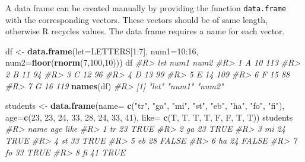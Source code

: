 \documentclass[]{book}
\newenvironment{Shaded}{}{}
\newcommand{\CommentTok}[1]{\textcolor[rgb]{0.38,0.63,0.69}{\textit{#1}}}
\newcommand{\DataTypeTok}[1]{\textcolor[rgb]{0.56,0.13,0.00}{#1}}
\newcommand{\DecValTok}[1]{\textcolor[rgb]{0.25,0.63,0.44}{#1}}
\newcommand{\KeywordTok}[1]{\textcolor[rgb]{0.00,0.44,0.13}{\textbf{#1}}}
\newcommand{\NormalTok}[1]{#1}
\newcommand{\OperatorTok}[1]{\textcolor[rgb]{0.40,0.40,0.40}{#1}}
\newcommand{\StringTok}[1]{\textcolor[rgb]{0.25,0.44,0.63}{#1}}
\theoremstyle{definition}
\theoremstyle{definition}
\theoremstyle{definition}
\theoremstyle{remark}
\begin{document}
A data frame can be created manually by providing the function
\texttt{data.frame} with the corresponding vectors. These vectors should
be of same length, otherwise R recycles values. The data frame requires
a name for each vector.

\begin{Shaded}
\begin{Highlighting}[]
\NormalTok{df <-}\StringTok{ }\KeywordTok{data.frame}\NormalTok{(}\DataTypeTok{let=}\NormalTok{LETTERS[}\DecValTok{1}\OperatorTok{:}\DecValTok{7}\NormalTok{],}
                 \DataTypeTok{num1=}\DecValTok{10}\OperatorTok{:}\DecValTok{16}\NormalTok{, }
                 \DataTypeTok{num2=}\KeywordTok{floor}\NormalTok{(}\KeywordTok{rnorm}\NormalTok{(}\DecValTok{7}\NormalTok{,}\DecValTok{100}\NormalTok{,}\DecValTok{10}\NormalTok{)))}
\NormalTok{df}
\CommentTok{#R>   let num1 num2}
\CommentTok{#R> 1   A   10  113}
\CommentTok{#R> 2   B   11   94}
\CommentTok{#R> 3   C   12   96}
\CommentTok{#R> 4   D   13   99}
\CommentTok{#R> 5   E   14  109}
\CommentTok{#R> 6   F   15   88}
\CommentTok{#R> 7   G   16  119}
\KeywordTok{names}\NormalTok{(df)}
\CommentTok{#R> [1] "let"  "num1" "num2"}
\end{Highlighting}
\end{Shaded}

\begin{Shaded}
\begin{Highlighting}[]
\NormalTok{students <-}\StringTok{ }\KeywordTok{data.frame}\NormalTok{(}\DataTypeTok{name=} \KeywordTok{c}\NormalTok{(}\StringTok{"tr"}\NormalTok{, }\StringTok{"ga"}\NormalTok{, }\StringTok{"mi"}\NormalTok{, }\StringTok{"st"}\NormalTok{, }\StringTok{"eb"}\NormalTok{, }\StringTok{"ha"}\NormalTok{, }\StringTok{"fo"}\NormalTok{, }\StringTok{"fi"}\NormalTok{),}
                       \DataTypeTok{age=}\KeywordTok{c}\NormalTok{(}\DecValTok{23}\NormalTok{, }\DecValTok{23}\NormalTok{, }\DecValTok{24}\NormalTok{, }\DecValTok{33}\NormalTok{, }\DecValTok{28}\NormalTok{, }\DecValTok{24}\NormalTok{, }\DecValTok{33}\NormalTok{, }\DecValTok{41}\NormalTok{),}
                       \DataTypeTok{like=} \KeywordTok{c}\NormalTok{(T, T, T, T, F, F, T, T)) }
\NormalTok{students}
\CommentTok{#R>   name age  like}
\CommentTok{#R> 1   tr  23  TRUE}
\CommentTok{#R> 2   ga  23  TRUE}
\CommentTok{#R> 3   mi  24  TRUE}
\CommentTok{#R> 4   st  33  TRUE}
\CommentTok{#R> 5   eb  28 FALSE}
\CommentTok{#R> 6   ha  24 FALSE}
\CommentTok{#R> 7   fo  33  TRUE}
\CommentTok{#R> 8   fi  41  TRUE}
\end{Highlighting}
\end{Shaded}
\end{document}
